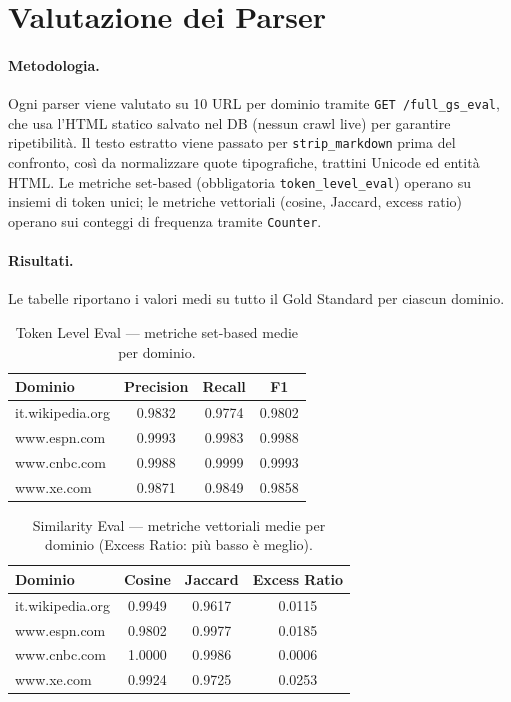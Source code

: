 \documentclass[11pt]{article}
\begin{document}

\section{Valutazione dei Parser}

\paragraph{Metodologia.} Ogni parser viene valutato su 10 URL per dominio tramite \texttt{GET /full\_gs\_eval}, che usa l'HTML statico salvato nel DB (nessun crawl live) per garantire ripetibilità. Il testo estratto viene passato per \texttt{strip\_markdown} prima del confronto, così da normalizzare quote tipografiche, trattini Unicode ed entità HTML. Le metriche set-based (obbligatoria \texttt{token\_level\_eval}) operano su insiemi di token unici; le metriche vettoriali (cosine, Jaccard, excess ratio) operano sui conteggi di frequenza tramite \texttt{Counter}.

\paragraph{Risultati.} Le tabelle riportano i valori medi su tutto il Gold Standard per ciascun dominio.

\begin{table}[h]
\centering
\small
\begin{tabular}{lccc}
\toprule
\textbf{Dominio} & \textbf{Precision} & \textbf{Recall} & \textbf{F1}\\
\midrule
it.wikipedia.org  & 0.9832 & 0.9774 & 0.9802 \\
www.espn.com      & 0.9993 & 0.9983 & 0.9988 \\
www.cnbc.com      & 0.9988 & 0.9999 & 0.9993 \\
www.xe.com        & 0.9871 & 0.9849 & 0.9858 \\
\bottomrule
\end{tabular}
\caption{Token Level Eval — metriche set-based medie per dominio.}
\end{table}

\begin{table}[h]
\centering
\small
\begin{tabular}{lccc}
\toprule
\textbf{Dominio} & \textbf{Cosine} & \textbf{Jaccard} & \textbf{Excess Ratio}\\
\midrule
it.wikipedia.org  & 0.9949 & 0.9617 & 0.0115 \\
www.espn.com      & 0.9802 & 0.9977 & 0.0185 \\
www.cnbc.com      & 1.0000 & 0.9986 & 0.0006 \\
www.xe.com        & 0.9924 & 0.9725 & 0.0253 \\
\bottomrule
\end{tabular}
\caption{Similarity Eval — metriche vettoriali medie per dominio (Excess Ratio: più basso è meglio).}
\end{table}
\end{document}
